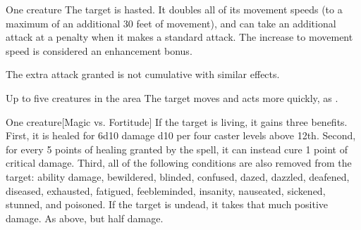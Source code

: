 \begin{spellheader}
    \spelldur{\durshort}
\end{spellheader}
\begin{spelleffects}
    \begin{spelltarget}{One creature}
        \spelleffect The target is hasted. It doubles all of its movement speeds (to a maximum of an additional 30 feet of movement), and can take an additional attack at a  penalty when it makes a standard attack. The increase to movement speed is considered an enhancement bonus.
    \end{spelltarget}
\end{spelleffects}
\begin{spellfooter}
    \spellnotes The extra attack granted is not cumulative with similar effects.
\end{spellfooter}

\begin{spellheader}
\end{spellheader}
\begin{spelleffects}
    \begin{spelltargets}{Up to five creatures in the area}
        \spelleffect The target moves and acts more quickly, as .
    \end{spelltargets}
\end{spelleffects}

\begin{spellheader}
    \spellrng{\rngclose}
\end{spellheader}
\begin{spelleffects}
    \begin{spelltarget}{One creature}[Magic vs. Fortitude]
        \spelleffect If the target is living, it gains three benefits. First, it is healed for 6d10 damage \add d10 per four caster levels above 12th. Second, for every 5 points of healing granted by the spell, it can instead cure 1 point of critical damage. Third, all of the following conditions are also removed from the target: ability damage, bewildered, blinded, confused, dazed, dazzled, deafened, diseased, exhausted, fatigued, feebleminded, insanity, nauseated, sickened, stunned, and poisoned.
        \spellsuccess If the target is undead, it takes that much positive damage.
        \spellfailure As above, but half damage.
    \end{spelltarget}
\end{spelleffects}


